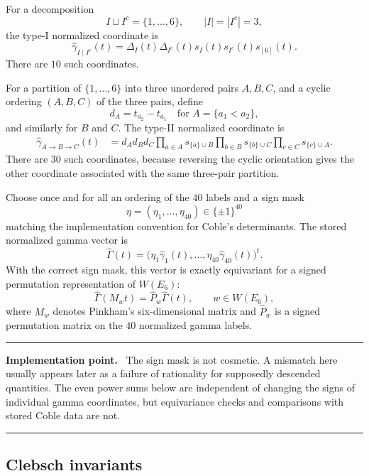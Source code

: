 \documentclass[11pt]{article}
\newcommand{\Gamhat}{\widehat{\Gamma}}
\newcommand{\gamhat}{\widehat{\gamma}}
\newenvironment{implementationbox}{%
  \begin{center}\begin{minipage}{0.94\textwidth}\small
  \hrule\vspace{0.55em}\textbf{Implementation point.}\ }{%
  \vspace{0.55em}\hrule\end{minipage}\end{center}%
}
\begin{document}
For a decomposition
\[
  I\sqcup I^c=\{1,\ldots,6\},\qquad |I|=|I^c|=3,
\]
the type-I normalized coordinate is
\begin{equation}
 \boxed{
  \gamhat_{I\mid I^c}(t)
  =\Delta_I(t)\Delta_{I^c}(t)s_I(t)s_{I^c}(t)s_{[6]}(t).
 }
 \label{eq:gammahatI}
\end{equation}
There are $10$ such coordinates.

For a partition of $\{1,\ldots,6\}$ into three unordered pairs $A,B,C$, and a
cyclic ordering $(A,B,C)$ of the three pairs, define
\[
  d_A=t_{a_2}-t_{a_1}\quad\text{for }A=\{a_1<a_2\},
\]
and similarly for $B$ and $C$.  The type-II normalized coordinate is
\begin{equation}
\boxed{
\begin{aligned}
 \gamhat_{A\to B\to C}(t)
 &=d_A d_B d_C
 \prod_{a\in A}s_{\{a\}\cup B}
 \prod_{b\in B}s_{\{b\}\cup C}
 \prod_{c\in C}s_{\{c\}\cup A}.
\end{aligned}}
\label{eq:gammahatII}
\end{equation}
There are $30$ such coordinates, because reversing the cyclic orientation gives
the other coordinate associated with the same three-pair partition.

Choose once and for all an ordering of the $40$ labels and a sign mask
\[
  \eta=(\eta_1,\ldots,\eta_{40})\in\{\pm1\}^{40}
\]
matching the implementation convention for Coble's determinants.  The stored
normalized gamma vector is
\[
  \Gamhat(t)=\bigl(\eta_1\gamhat_1(t),\ldots,
  \eta_{40}\gamhat_{40}(t)\bigr)^t.
\]
With the correct sign mask, this vector is exactly equivariant for a signed
permutation representation of $W(E_6)$:
\begin{equation}
  \Gamhat(M_wt)=\widehat P_w\Gamhat(t),
  \qquad w\in W(E_6),
  \label{eq:gamma-equivariance}
\end{equation}
where $M_w$ denotes Pinkham's six-dimensional matrix and $\widehat P_w$ is a signed
permutation matrix on the $40$ normalized gamma labels.

\begin{implementationbox}
The sign mask is not cosmetic.  A mismatch here usually appears later as a failure
of rationality for supposedly descended quantities.  The even power sums below are
independent of changing the signs of individual gamma coordinates, but equivariance
checks and comparisons with stored Coble data are not.
\end{implementationbox}

\subsection{Clebsch invariants}
\end{document}

